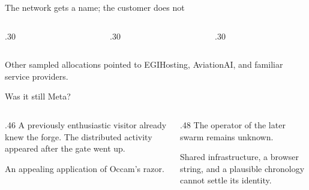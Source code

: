 \documentclass[aspectratio=169,11pt]{beamer}
\begin{document}
\begin{frame}{The network gets a name; the customer does not}
  \bigskip
  \begin{columns}[T,onlytextwidth]
    \begin{column}{.30\textwidth}\end{column}
    \begin{column}{.30\textwidth}\end{column}
    \begin{column}{.30\textwidth}\end{column}
  \end{columns}
  \bigskip\bigskip
  Other sampled allocations pointed to EGIHosting, AviationAI, and
  familiar service providers.\par\medskip
\end{frame}

\begin{frame}{Was it still Meta?}
  \begin{columns}[T,onlytextwidth]
    \begin{column}{.46\textwidth}
      A previously enthusiastic visitor already knew the forge.
      The distributed activity appeared after the gate went up.\par\medskip
      An appealing application of Occam's razor.
    \end{column}
    \begin{column}{.48\textwidth}
      The operator of the later swarm remains unknown.\par\medskip
      Shared infrastructure, a browser string, and a plausible chronology
      cannot settle its identity.\par\medskip
    \end{column}
  \end{columns}
\end{frame}
\end{document}
